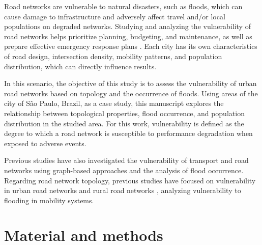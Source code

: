 \documentclass{pssbmac}
\begin{document}
Road networks are vulnerable to natural disasters, such as floods, which can cause damage to infrastructure and adversely affect travel and/or local populations on degraded networks. Studying and analyzing the vulnerability of road networks helps prioritize planning, budgeting, and maintenance, as well as prepare effective emergency response plans \cite{balijepalliMeasuringVulnerabilityRoad2014}. Each city has its own characteristics of road design, intersection density, mobility patterns, and population distribution, which can directly influence results.


In this scenario, the objective of this study is to assess the vulnerability of urban road networks based on topology and the occurrence of floods. Using areas of the city of São Paulo, Brazil, as a case study, this manuscript explores the relationship between topological properties, flood occurrence, and population distribution in the studied area. For this work, vulnerability is defined as the degree to which a road network is susceptible to performance degradation when exposed to adverse events.

Previous studies have also investigated the vulnerability of transport and road networks using graph-based approaches and the analysis of flood occurrence. Regarding road network topology, previous studies have focused on vulnerability in urban road networks \cite{morelliMeasuringUrbanRoad2021} and rural road networks \cite{santosVulnerabilityAnalysisComplex2023}, analyzing vulnerability to flooding in mobility systems.



\section{Material and methods}
\end{document}
